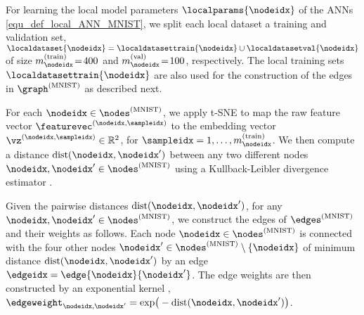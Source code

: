 \documentclass[lettersize,journal]{IEEEtran}
\newcommand{\nodesmnist}{\nodes^{(\rm MNIST)}}
\newcommand{\edgesmnist}{\edges^{(\rm MNIST)}}
\newcommand{\localvalsetsize}[1]{m^{(\rm val)}_{#1}}
\newcommand{\localtrainsetsize}[1]{m^{(\rm train)}_{#1}}
\begin{document}
For learning the local model parameters $\localparams{\nodeidx}$ of the ANNs \eqref{equ_def_local_ANN_MNIST}, 
we split each local dataset a training and validation set, $\localdataset{\nodeidx} = \localdatasettrain{\nodeidx} \cup \localdatasetval{\nodeidx}$ 
of size $\localtrainsetsize{\nodeidx}\!=\!400$ and $\localvalsetsize{\nodeidx}\!=\!100$, respectively. 
The local training sets $\localdatasettrain{\nodeidx}$ are also used for the construction of the 
edges in $\graph^{(\rm MNIST)}$ as described next. 

For each $\nodeidx \in \nodesmnist$, we apply {\rm t-SNE} \cite{tSNEPaper} to map the raw feature vector 
$\featurevec^{(\nodeidx,\sampleidx)}$ to the embedding vector $\vz^{(\nodeidx,\sampleidx)} \in \mathbb{R}^{2}$, 
for $\sampleidx =1,\ldots, \localtrainsetsize{\nodeidx}$. We then compute a distance  
${\rm dist}(\nodeidx,\nodeidx')$ between any two different nodes $\nodeidx, \nodeidx' \in \nodesmnist$ 
using a Kullback-Leibler divergence estimator \cite{PerezCruz2008}. 

Given the pairwise distances ${\rm dist}(\nodeidx,\nodeidx')$, for any $\nodeidx,\nodeidx' \in \nodesmnist$, 
we construct the edges of $\edgesmnist$ and their weights as follows. Each node $\nodeidx \in \nodesmnist$ 
is connected with the four other nodes $\nodeidx' \in \nodesmnist \setminus \{ \nodeidx\}$ of 
minimum distance ${\rm dist}(\nodeidx,\nodeidx')$ by an edge $\edgeidx=\edge{\nodeidx}{\nodeidx'}$. 
The edge weights are then constructed by an exponential kernel \cite{Luxburg2007}, $\edgeweight_{\nodeidx,\nodeidx'} = {\rm exp} \big(-{\rm dist}(\nodeidx,\nodeidx') \big)$.
\end{document}
